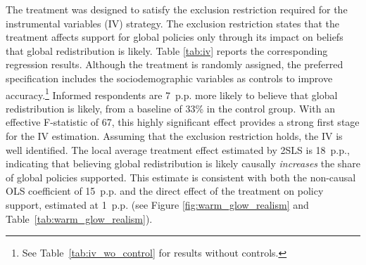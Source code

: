 \documentclass[12pt,english]{article}
\begin{document}
\begin{bibunit}
The treatment was designed to satisfy the exclusion restriction required for the instrumental variables (IV) strategy. The exclusion restriction states that the treatment affects support for global policies only through its impact on beliefs that global redistribution is likely. Table \ref{tab:iv} reports the corresponding regression results. Although the treatment is randomly assigned, the preferred specification includes the sociodemographic variables as controls to improve accuracy.\footnote{See Table~\ref{tab:iv_wo_control} for results without controls.
} 
Informed respondents are 7~p.p. more likely to believe that global redistribution is likely, from a baseline of 33\% in the control group. With an effective F-statistic of 67, this highly significant effect provides a strong first stage for the IV estimation. Assuming that the exclusion restriction holds, the IV is well identified. The local average treatment effect estimated by 2SLS is 18~p.p., indicating that believing global redistribution is likely causally \textit{increases} the share of global policies supported. This estimate is consistent with both the non-causal OLS coefficient of 15~p.p. and the direct effect of the treatment on policy support, estimated at 1~p.p. (see Figure \ref{fig:warm_glow_realism} and Table~\ref{tab:warm_glow_realism}).



\end{bibunit}
\end{document}
